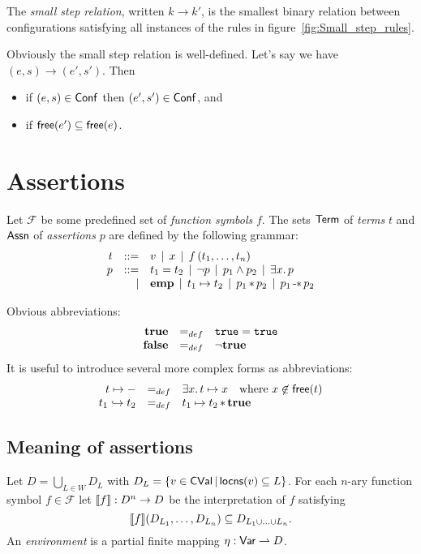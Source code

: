 \documentclass[12pt,a4paper]{article}
\newcommand{\CVal}{\sstyle{CVal}}
\newcommand{\Conf}{\sstyle{Conf}}
\newcommand{\emp}{\ensuremath{\mathbf{emp}}}
\begin{document}
\begin{definition}
  The {\em small step relation}, written $k \to k'$, is the smallest binary relation between configurations
  satisfying all instances of the rules in figure~\ref{fig:Small_step_rules}.
\end{definition}

Obviously the small step relation is well-defined. Let's say we have $(e,s)\to(e',s')$. Then
\begin{itemize}
\item if $(e,s)\in\Conf$ then $(e',s')\in\Conf$, and
\item if $\mathsf{free}(e') \subseteq \mathsf{free}(e)$.
\end{itemize}


\section{Assertions}

\begin{definition}[Assertions]
  Let $\mathcal{F}$ be some predefined set of {\em function symbols} $f$.
  The sets $\mathsf{Term}$ of {\em terms} $t$ and $\mathsf{Assn}$ of {\em assertions} $p$ are defined by the following grammar:
  \[\GRbeg
  t \GRis v \GRmid x \GRmid f\,(t_1,\ldots,t_n)
  \\
  p \GRis t_1 = t_2 \GRmid \neg p \GRmid p_1 \wedge p_2 \GRmid \exists x.\,p
  \GRal \emp \GRmid t_1 \mapsto t_2 \GRmid p_1 \sepcon p_2 \GRmid p_1 \sepimp p_2
  \GRend\]
\end{definition}

Obvious abbreviations:
\[\begin{array}{rcl}
  \mathbf{true} &=_{def}& \mathtt{true} = \mathtt{true} \\
  \mathbf{false} &=_{def}& \neg \mathbf{true}
\end{array}\]
It is useful to introduce several more complex forms as abbreviations:
\[\begin{array}{rcl}
  t \mapsto - &=_{def}& \exists x.\,t \mapsto x \quad \text{where $x\not\in\mathsf{free}(t)$} \\
  t_1 \hookrightarrow t_2 &=_{def}& t_1 \mapsto t_2 \operatorname{\ast} \mathbf{true}
\end{array}\]


\subsection{Meaning of assertions}

Let $D = \bigcup_{L\in W} D_L$ with $D_L = \{v\in\CVal\,|\,\locns{v} \subseteq L\}$.
For each $n$-ary function symbol $f\in\mathcal{F}$ let
$\llbracket f\rrbracket: D^n \to D$ be the interpretation of $f$ satisfying
\[
\llbracket f\rrbracket(D_{L_1},\ldots,D_{L_n}) \subseteq D_{L_1 \cup \ldots \cup L_n}.
\]
An {\em environment} is a partial finite mapping $\eta:\mathsf{Var} \rightharpoonup D$.
\end{document}
